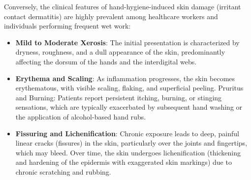 Conversely, the clinical features of hand-hygiene-induced skin damage (irritant contact dermatitis) are highly prevalent among healthcare workers and individuals performing frequent wet work:
\begin{itemize}
    \item \textbf{Mild to Moderate Xerosis}: The initial presentation is characterized by dryness, roughness, and a dull appearance of the skin, predominantly affecting the dorsum of the hands and the interdigital webs.
    \item \textbf{Erythema and Scaling}: As inflammation progresses, the skin becomes erythematous, with visible scaling, flaking, and superficial peeling.
    Pruritus and Burning: Patients report persistent itching, burning, or stinging sensations, which are typically exacerbated by subsequent hand washing or the application of alcohol-based hand rubs.
    \item \textbf{Fissuring and Lichenification}: Chronic exposure leads to deep, painful linear cracks (fissures) in the skin, particularly over the joints and fingertips, which may bleed. Over time, the skin undergoes lichenification (thickening and hardening of the epidermis with exaggerated skin markings) due to chronic scratching and rubbing.
\end{itemize}

